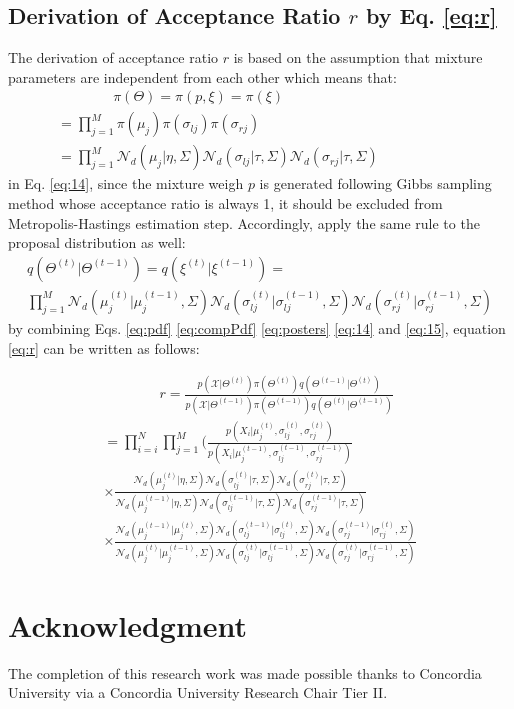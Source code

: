 \documentclass[conference]{IEEEtran}
\begin{document}
\subsection{Derivation of Acceptance Ratio $r$ by Eq. \eqref{eq:r}}
The derivation of acceptance ratio $r$ is based on the assumption that mixture parameters are independent from each other which means that:
\bigskip
\begin{multline}
\qquad\qquad\pi(\Theta) = \pi(p,\xi) = \pi(\xi) \\
= \prod_{j=1}^M\pi(\mu_j)\pi(\sigma_{lj})\pi(\sigma_{rj}) \qquad\qquad\qquad\qquad\qquad\\
= \prod_{j=1}^M\mathcal{N}_d(\mu_j|\eta,\Sigma)\mathcal{N}_d(\sigma_{lj}|\tau,\Sigma)\mathcal{N}_d(\sigma_{rj}|\tau,\Sigma)\qquad\qquad\qquad
\label{eq:14}
\end{multline}
in Eq. \eqref{eq:14}, since the mixture weigh $p$ is generated following Gibbs sampling method whose acceptance ratio is always 1, it should be excluded from Metropolis-Hastings estimation step. Accordingly, apply the same rule to the proposal distribution as well:
\begin{multline}
q(\Theta^{(t)}|\Theta^{(t-1)}) = q(\xi^{(t)}|\xi^{(t-1)})= \\
\prod_{j=1}^M\mathcal{N}_d(\mu_j^{(t)}|\mu_j^{(t-1)},\Sigma)\mathcal{N}_d(\sigma_{lj}^{(t)}|\sigma_{lj}^{(t-1)},\Sigma)\mathcal{N}_d(\sigma_{rj}^{(t)}|\sigma_{rj}^{(t-1)},\Sigma)
\label{eq:15}
\end{multline}
by combining Eqs. \eqref{eq:pdf} \eqref{eq:compPdf} \eqref{eq:posters} \eqref{eq:14} and \eqref{eq:15}, equation \eqref{eq:r} can be written as follows:

\begin{multline}
\qquad\qquad r = \frac{p(\mathcal{X}|\Theta^{(t)})\pi(\Theta^{(t)})q(\Theta^{(t-1)}|\Theta^{(t)})}{p(\mathcal{X}|\Theta^{(t-1)})\pi(\Theta^{(t-1)})q(\Theta^{(t)}|\Theta^{(t-1)})} \\
= \prod_{i=i}^N \prod_{j=1}^M(\frac{p(X_i|\mu_j^{(t)},\sigma_{lj}^{(t)},\sigma_{rj}^{(t)})}
{p(X_i|\mu_j^{(t-1)},\sigma_{lj}^{(t-1)},\sigma_{rj}^{(t-1)})} \qquad\qquad\\
\times \frac{\mathcal{N}_d(\mu_j^{(t)}|\eta,\Sigma)\mathcal{N}_d(\sigma_{lj}^{(t)}|\tau,\Sigma)\mathcal{N}_d(\sigma_{rj}^{(t)}|\tau,\Sigma)}{\mathcal{N}_d(\mu_j^{(t-1)}|\eta,\Sigma)\mathcal{N}_d(\sigma_{lj}^{(t-1)}|\tau,\Sigma)\mathcal{N}_d(\sigma_{rj}^{(t-1)}|\tau,\Sigma)} \\
\times \frac{\mathcal{N}_d(\mu_j^{(t-1)}|\mu_j^{(t)},\Sigma)\mathcal{N}_d(\sigma_{lj}^{(t-1)}|\sigma_{lj}^{(t)},\Sigma)\mathcal{N}_d(\sigma_{rj}^{(t-1)}|\sigma_{rj}^{(t)},\Sigma)}{\mathcal{N}_d(\mu_j^{(t)}|\mu_j^{(t-1)},\Sigma)\mathcal{N}_d(\sigma_{lj}^{(t)}|\sigma_{lj}^{(t-1)},\Sigma)\mathcal{N}_d(\sigma_{rj}^{(t)}|\sigma_{rj}^{(t-1)},\Sigma)}
\label{eq:16}
\end{multline}

\section*{Acknowledgment}
The completion of this research work was made possible thanks to Concordia University via a Concordia University Research Chair Tier II.



\end{document}
